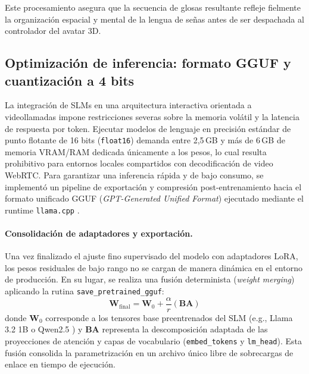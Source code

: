 Este procesamiento asegura que la secuencia de glosas resultante refleje fielmente la organización espacial y mental de la lengua de señas antes de ser despachada al controlador del avatar 3D.

\subsection{Optimización de inferencia: formato GGUF y cuantización a 4 bits}

La integración de SLMs en una arquitectura interactiva orientada a videollamadas impone restricciones severas sobre la memoria volátil y la latencia de respuesta por token. Ejecutar modelos de lenguaje en precisión estándar de punto flotante de 16 bits (\texttt{float16}) demanda entre 2{,}5\,GB y más de 6\,GB de memoria VRAM/RAM dedicada únicamente a los pesos, lo cual resulta prohibitivo para entornos locales compartidos con decodificación de video WebRTC. Para garantizar una inferencia rápida y de bajo consumo, se implementó un pipeline de exportación y compresión post-entrenamiento hacia el formato unificado GGUF (\textit{GPT-Generated Unified Format}) ejecutado mediante el runtime \texttt{llama.cpp} \parencite{gerganov2023llamacpp}.

\paragraph{Consolidación de adaptadores y exportación.}
Una vez finalizado el ajuste fino supervisado del modelo con adaptadores LoRA, los pesos residuales de bajo rango no se cargan de manera dinámica en el entorno de producción. En su lugar, se realiza una fusión determinista (\textit{weight merging}) aplicando la rutina \texttt{save\_pretrained\_gguf}:
\begin{equation}
    \mathbf{W}_{\text{final}} = \mathbf{W}_0 + \frac{\alpha}{r} (\mathbf{B}\mathbf{A})
\end{equation}
donde $\mathbf{W}_0$ corresponde a los tensores base preentrenados del SLM (e.g., Llama 3.2 1B \parencite{dubey2024llama3} o Qwen2.5 \parencite{qwen2024qwen25}) y $\mathbf{B}\mathbf{A}$ representa la descomposición adaptada de las proyecciones de atención y capas de vocabulario (\texttt{embed\_tokens} y \texttt{lm\_head}). Esta fusión consolida la parametrización en un archivo único libre de sobrecargas de enlace en tiempo de ejecución.

